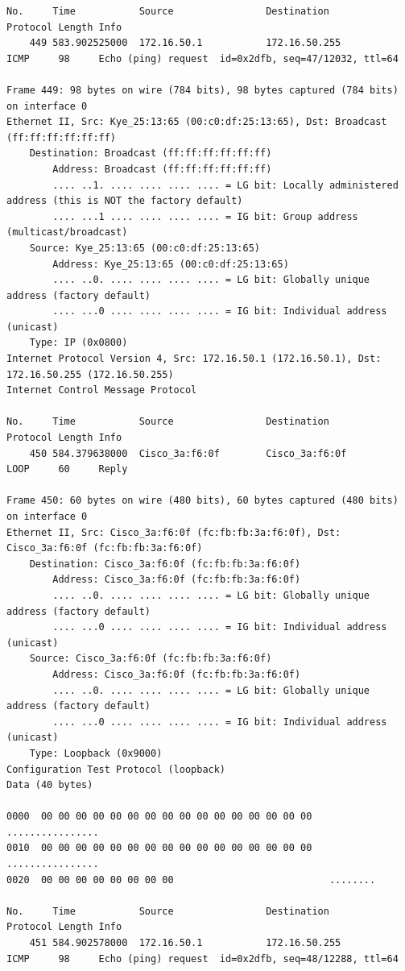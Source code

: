 \documentclass[a4paper,11pt]{article}
\begin{document}
\begin{lstlisting}
No.     Time           Source                Destination           Protocol Length Info
    449 583.902525000  172.16.50.1           172.16.50.255         ICMP     98     Echo (ping) request  id=0x2dfb, seq=47/12032, ttl=64

Frame 449: 98 bytes on wire (784 bits), 98 bytes captured (784 bits) on interface 0
Ethernet II, Src: Kye_25:13:65 (00:c0:df:25:13:65), Dst: Broadcast (ff:ff:ff:ff:ff:ff)
    Destination: Broadcast (ff:ff:ff:ff:ff:ff)
        Address: Broadcast (ff:ff:ff:ff:ff:ff)
        .... ..1. .... .... .... .... = LG bit: Locally administered address (this is NOT the factory default)
        .... ...1 .... .... .... .... = IG bit: Group address (multicast/broadcast)
    Source: Kye_25:13:65 (00:c0:df:25:13:65)
        Address: Kye_25:13:65 (00:c0:df:25:13:65)
        .... ..0. .... .... .... .... = LG bit: Globally unique address (factory default)
        .... ...0 .... .... .... .... = IG bit: Individual address (unicast)
    Type: IP (0x0800)
Internet Protocol Version 4, Src: 172.16.50.1 (172.16.50.1), Dst: 172.16.50.255 (172.16.50.255)
Internet Control Message Protocol

No.     Time           Source                Destination           Protocol Length Info
    450 584.379638000  Cisco_3a:f6:0f        Cisco_3a:f6:0f        LOOP     60     Reply

Frame 450: 60 bytes on wire (480 bits), 60 bytes captured (480 bits) on interface 0
Ethernet II, Src: Cisco_3a:f6:0f (fc:fb:fb:3a:f6:0f), Dst: Cisco_3a:f6:0f (fc:fb:fb:3a:f6:0f)
    Destination: Cisco_3a:f6:0f (fc:fb:fb:3a:f6:0f)
        Address: Cisco_3a:f6:0f (fc:fb:fb:3a:f6:0f)
        .... ..0. .... .... .... .... = LG bit: Globally unique address (factory default)
        .... ...0 .... .... .... .... = IG bit: Individual address (unicast)
    Source: Cisco_3a:f6:0f (fc:fb:fb:3a:f6:0f)
        Address: Cisco_3a:f6:0f (fc:fb:fb:3a:f6:0f)
        .... ..0. .... .... .... .... = LG bit: Globally unique address (factory default)
        .... ...0 .... .... .... .... = IG bit: Individual address (unicast)
    Type: Loopback (0x9000)
Configuration Test Protocol (loopback)
Data (40 bytes)

0000  00 00 00 00 00 00 00 00 00 00 00 00 00 00 00 00   ................
0010  00 00 00 00 00 00 00 00 00 00 00 00 00 00 00 00   ................
0020  00 00 00 00 00 00 00 00                           ........

No.     Time           Source                Destination           Protocol Length Info
    451 584.902578000  172.16.50.1           172.16.50.255         ICMP     98     Echo (ping) request  id=0x2dfb, seq=48/12288, ttl=64


\end{lstlisting}
\end{document}
